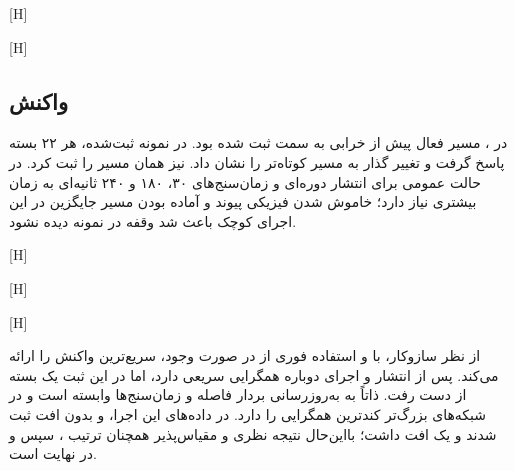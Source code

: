[H]

[H]

\subsection{واکنش }

در ، مسیر فعال پیش از خرابی به سمت  ثبت شده بود. در نمونه
ثبت‌شده، هر ۲۲ بسته پاسخ گرفت و تغییر  گذار به مسیر کوتاه‌تر
 را نشان داد.  نیز همان مسیر  را ثبت کرد.
 در حالت عمومی برای انتشار دوره‌ای و زمان‌سنج‌های ۳۰، ۱۸۰ و ۲۴۰
ثانیه‌ای به زمان بیشتری نیاز دارد؛ خاموش شدن فیزیکی پیوند و آماده بودن مسیر
جایگزین در این اجرای کوچک باعث شد وقفه در نمونه  دیده نشود.

[H]

[H]

[H]

از نظر سازوکار،  با  و استفاده فوری از
 در صورت وجود، سریع‌ترین واکنش را ارائه می‌کند.
 پس از انتشار  و اجرای دوباره  همگرایی سریعی دارد،
اما در این ثبت یک بسته از دست رفت.  ذاتاً به به‌روزرسانی بردار فاصله
 و زمان‌سنج‌ها وابسته است و در شبکه‌های بزرگ‌تر
کندترین همگرایی را دارد. در داده‌های این اجرا،  و  بدون
افت ثبت شدند و  یک افت داشت؛ بااین‌حال نتیجه نظری و مقیاس‌پذیر
همچنان ترتیب ، سپس  و در نهایت  است.
